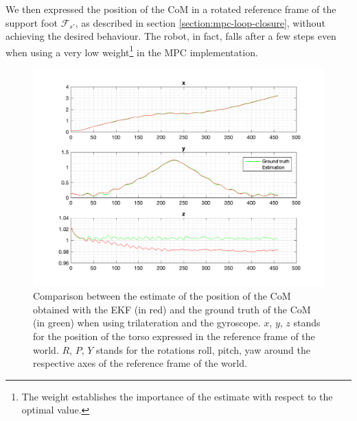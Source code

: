 \documentclass[a4paper]{article}
\begin{document}
We then expressed the position of the CoM
in a rotated reference frame of the support foot $\mathcal{F}_{s'}$,
as described in section \ref{section:mpc-loop-closure}, without achieving the
desired behaviour. The robot, in fact, falls after a few steps even when using
a very low weight\footnote{The weight establishes the importance of the
estimate with respect to the optimal value.} in the MPC implementation. %
\begin{figure}
    \centering
    \includegraphics[width=\textwidth]{images/trilateration_com.png}
    \caption{Comparison between the estimate of the position of the CoM
        obtained with the EKF (in red) and the ground truth of the CoM
        (in green) when using trilateration and the gyroscope.
        $x$, $y$, $z$ stands for the position
        of the torso expressed in the reference frame of the
        world. $R$, $P$, $Y$ stands for the rotations roll,
        pitch, yaw around the respective axes of the
        reference frame of the world.}
    \label{fig:comp_estimated_torso_com}
\end{figure}
\end{document}
